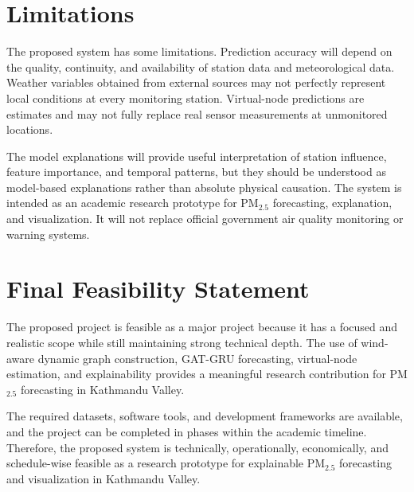\section{Limitations}
The proposed system has some limitations. Prediction accuracy will depend on the quality, continuity, and availability of station data and meteorological data. Weather variables obtained from external sources may not perfectly represent local conditions at every monitoring station. Virtual-node predictions are estimates and may not fully replace real sensor measurements at unmonitored locations.

The model explanations will provide useful interpretation of station influence, feature importance, and temporal patterns, but they should be understood as model-based explanations rather than absolute physical causation. The system is intended as an academic research prototype for PM$_{2.5}$ forecasting, explanation, and visualization. It will not replace official government air quality monitoring or warning systems.

\section{Final Feasibility Statement}
The proposed project is feasible as a major project because it has a focused and realistic scope while still maintaining strong technical depth. The use of wind-aware dynamic graph construction, GAT-GRU forecasting, virtual-node estimation, and explainability provides a meaningful research contribution for PM$_{2.5}$ forecasting in Kathmandu Valley.

The required datasets, software tools, and development frameworks are available, and the project can be completed in phases within the academic timeline. Therefore, the proposed system is technically, operationally, economically, and schedule-wise feasible as a research prototype for explainable PM$_{2.5}$ forecasting and visualization in Kathmandu Valley.
